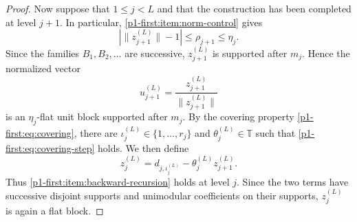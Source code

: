 \documentclass[10pt,a4paper]{amsart}
\newcommand{\T}{\mathbb T}
\begin{document}
\begin{proof}
Now suppose that $1\leq j<L$ and that the construction has been completed at level $j+1$. In particular, \ref{p1-first:item:norm-control} gives
\begin{equation*}
        |\|z_{j+1}^{(L)}\|-1|\leq \rho_{j+1}\leq \eta_j.
\end{equation*}
Since the families $B_1,B_2,\ldots$ are successive, $z_{j+1}^{(L)}$ is supported after $m_j$. Hence the normalized vector
\begin{equation*}
        u_{j+1}^{(L)}=\frac{z_{j+1}^{(L)}}{\|z_{j+1}^{(L)}\|}
\end{equation*}
is an $\eta_j$-flat unit block supported after $m_j$. By the covering property \eqref{p1-first:eq:covering}, there are $\iota_j^{(L)}\in\{1,\ldots,r_j\}$ and $\theta_j^{(L)}\in\T$ such that \eqref{p1-first:eq:covering-step} holds. We then define
\begin{equation*}
        z_j^{(L)}=d_{j,\iota_j^{(L)}}-\theta_j^{(L)}z_{j+1}^{(L)}.
\end{equation*}
Thus \ref{p1-first:item:backward-recursion} holds at level $j$. Since the two terms have successive disjoint supports and unimodular coefficients on their supports, $z_j^{(L)}$ is again a flat block.


\end{proof}
\end{document}
